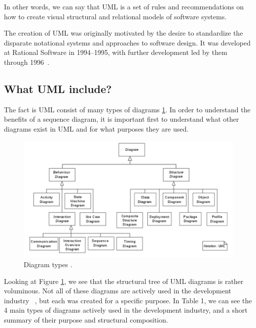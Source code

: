 \documentclass[10pt,slovak,a4paper]{article}
\begin{document}
In other words, we can say that UML is a set of rules and recommendations on how to create visual structural and relational models of software systems.

The creation of UML was originally motivated by the desire to standardize the disparate notational systems and approaches to software design. It was developed at Rational Software in 1994–1995, with further development led by them through 1996~\cite{UML_user_guide:Booch}.

\subsection{What UML include?}
The fact is UML consist of many types of diagrams \ref{UML:diagrams}. In order to understand the benefits of a sequence diagram, it is important first to understand what other diagrams exist in UML and for what purposes they are used.

\begin{figure}[tbh]
	\centering
	\includegraphics[scale=0.5]{UML diagrams.png}
	\caption{Diagram types \cite{UML_user_guide:Booch}.}
	\label{UML:diagrams}
	\end{figure}

Looking at Figure \ref{UML:diagrams}, we see that the structural tree of UML diagrams is rather voluminous. Not all of these diagrams are actively used in the development industry ~\cite{UML_Distilled}, but each was created for a specific purpose. In Table 1, we can see the 4 main types of diagrams actively used in the development industry, and a short summary of their purpose and structural composition.
\end{document}
